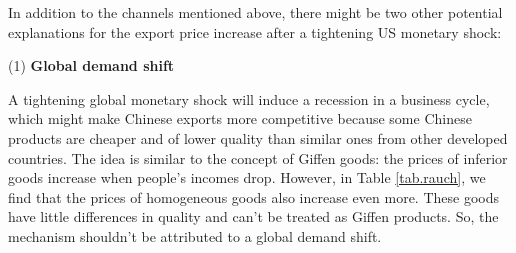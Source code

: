 In addition to the channels mentioned above, there might be two other potential explanations for the export price increase after a tightening US monetary shock:

(1) \textbf{Global demand shift} 

A tightening global monetary shock will induce a recession in a business cycle, which might make Chinese exports more competitive because some Chinese products are cheaper and of lower quality than similar ones from other developed countries. The idea is similar to the concept of Giffen goods: the prices of inferior goods increase when people's incomes drop. However, in Table \ref{tab.rauch}, we find that the prices of homogeneous goods also increase even more. These goods have little differences in quality and can't be treated as Giffen products. So, the mechanism shouldn't be attributed to a global demand shift.

